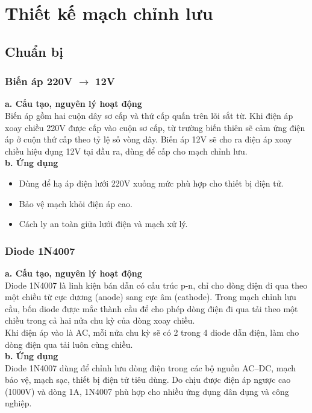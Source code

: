 \documentclass[a4paper,15pt]{article}
\begin{document}
\section{Thiết kế mạch chỉnh lưu}
\subsection{Chuẩn bị}
\subsubsection{Biến áp 220V $\rightarrow$ 12V}
\textbf{a. Cấu tạo, nguyên lý hoạt động}\\
Biến áp gồm hai cuộn dây sơ cấp và thứ cấp quấn trên lõi sắt từ. Khi điện áp xoay chiều 
220V được cấp vào cuộn sơ cấp, từ trường biến thiên sẽ cảm ứng điện áp ở cuộn thứ cấp 
theo tỷ lệ số vòng dây. Biến áp 12V sẽ cho ra điện áp xoay chiều hiệu dụng 12V tại đầu ra, 
dùng để cấp cho mạch chỉnh lưu.\\
\textbf{b. Ứng dụng} \\
\begin{itemize}
    \item Dùng để hạ áp điện lưới 220V xuống mức phù hợp cho thiết bị điện tử. 
    \item Bảo vệ mạch khỏi điện áp cao. 
    \item Cách ly an toàn giữa lưới điện và mạch xử lý.
\end{itemize}
\subsubsection{Diode 1N4007}
\textbf{a. Cấu tạo, nguyên lý hoạt động} \\
Diode 1N4007 là linh kiện bán dẫn có cấu trúc p-n, chỉ cho dòng điện đi qua theo một chiều 
từ cực dương (anode) sang cực âm (cathode). Trong mạch chỉnh lưu cầu, bốn diode được mắc 
thành cầu để cho phép dòng điện đi qua tải theo một chiều trong cả hai nửa chu kỳ của dòng 
xoay chiều.\\
Khi điện áp vào là AC, mỗi nửa chu kỳ sẽ có 2 trong 4 diode dẫn điện, làm cho dòng điện 
qua tải luôn cùng chiều. \\
\textbf{b. Ứng dụng}\\
Diode 1N4007 dùng để chỉnh lưu dòng điện trong các bộ nguồn AC–DC, mạch bảo vệ, mạch 
sạc, thiết bị điện tử tiêu dùng. Do chịu được điện áp ngược cao (1000V) và dòng 1A, 1N4007 
phù hợp cho nhiều ứng dụng dân dụng và công nghiệp. \\
\end{document}
